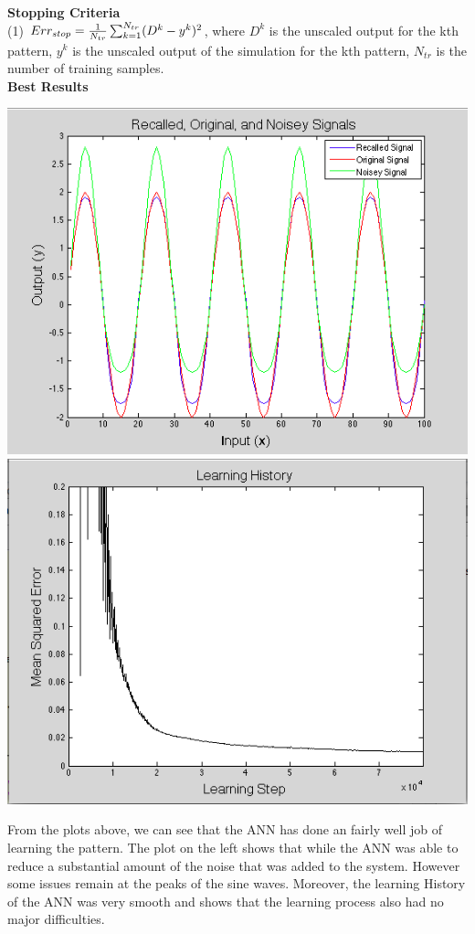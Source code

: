 \documentclass[epsfig]{article}
\begin{document}
\textbf{Stopping Criteria}\\
(1) $ Err_{stop} = {1\over{N_{tr}}}\sum_{k=1}^{N_{tr}} (D^k-y^k)^2$\label{err-stop}, where $D^k$ is the unscaled output for the kth  pattern, $y^k$ is the unscaled output of the simulation for the kth  pattern, $N_{tr}$ is the number of training samples.\\
\textbf{Best Results}
\begin{center}
\includegraphics[scale=0.38]{pic8}
\includegraphics[scale=0.38]{pic9}
\end{center}
From the plots above, we can see that the ANN has done an fairly well job of learning the pattern. The plot on the left shows that while the ANN was able to reduce a substantial amount of the noise that was added to the system. However some issues remain at the peaks of the sine waves. Moreover, the learning History of the ANN was very smooth and shows that the learning process also had no major difficulties.
\end{document}
